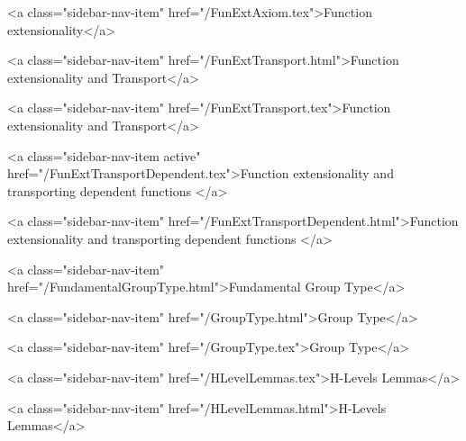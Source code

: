       
    
      
        
          <a class="sidebar-nav-item" href="/FunExtAxiom.tex">Function extensionality</a>
        
      
    
      
        
          <a class="sidebar-nav-item" href="/FunExtTransport.html">Function extensionality and Transport</a>
        
      
    
      
        
          <a class="sidebar-nav-item" href="/FunExtTransport.tex">Function extensionality and Transport</a>
        
      
    
      
        
          <a class="sidebar-nav-item active" href="/FunExtTransportDependent.tex">Function extensionality and transporting dependent functions </a>
        
      
    
      
        
          <a class="sidebar-nav-item" href="/FunExtTransportDependent.html">Function extensionality and transporting dependent functions </a>
        
      
    
      
        
          <a class="sidebar-nav-item" href="/FundamentalGroupType.html">Fundamental Group Type</a>
        
      
    
      
        
          <a class="sidebar-nav-item" href="/GroupType.html">Group Type</a>
        
      
    
      
        
          <a class="sidebar-nav-item" href="/GroupType.tex">Group Type</a>
        
      
    
      
        
          <a class="sidebar-nav-item" href="/HLevelLemmas.tex">H-Levels Lemmas</a>
        
      
    
      
        
          <a class="sidebar-nav-item" href="/HLevelLemmas.html">H-Levels Lemmas</a>
        
      
    
